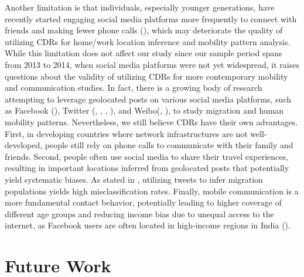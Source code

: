 Another limitation is that individuals, especially younger generations, have recently started engaging social media platforms more frequently to connect with friends and making fewer phone calls (\cite{garrett2023linking}), which may deteriorate the quality of utilizing CDRs for home/work location inference and mobility pattern analysis.
While this limitation does not affect our study since our sample period spans from 2013 to 2014, when social media platforms were not yet widespread, it raises questions about the validity of utilizing CDRs for more contemporary mobility and communication studies.
In fact, there is a growing body of research attempting to leverage geolocated posts on various social media platforms, such as Facebook (\cite{sahai2022social}), Twitter (\cite{zagheni2014inferring}, \cite{hawelka2014geo}, \cite{jurdak2015understanding}, \cite{luo2016explore}), and Weibo(\cite{cui2018social}, \cite{ebrahimpour2020analyzing}), to study migration and human mobility patterns.
Nevertheless, we still believe CDRs have their own advantages.
First, in developing countries where network infrastructures are not well-developed, people still rely on phone calls to communicate with their family and friends.
Second, people often use social media to share their travel experiences, resulting in important locations inferred from geolocated posts that potentially yield systematic biases. As stated in \cite{armstrong2021challenges}, utilizing tweets to infer migration populations yields high misclassification rates.
Finally, mobile communication is a more fundamental contact behavior, potentially leading to higher coverage of different age groups and reducing income bias due to unequal access to the internet, as Facebook users are often located in high-income regions in India (\cite{sahai2022social}).

\section{Future Work}
